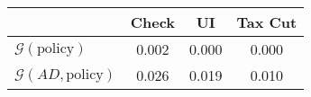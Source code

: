 \begin{tabular}{@{}lccc@{}} 
\toprule 
                          & Check      & UI    & Tax Cut    \\  \midrule 
$\mathcal{G}(\text{policy})$ & 0.002  & 0.000  & 0.000     \\ 
$\mathcal{G}(AD,\text{policy})$ & 0.026  & 0.019  & 0.010     \\ 
\end{tabular}  
